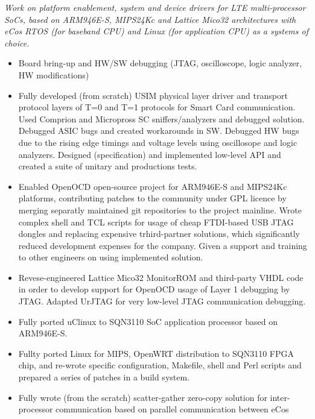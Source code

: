 \documentclass[a4paper, oneside, final]{scrartcl}
\begin{document}
   \textit{Work on platform enablement, system and device drivers for LTE
   multi-processor SoCs, based on ARM946E-S, MIPS24Kc and Lattice Mico32
   architectures with eCos RTOS (for baseband CPU) and Linux (for application CPU)
   as a systems of choice.}

\begin{itemize}
   \item Board bring-up and HW/SW debugging (JTAG, oscilloscope,
         logic analyzer, HW modifications)
   \item Fully developed (from scratch) USIM physical layer driver and
            transport protocol layers of T=0 and T=1 protocols for Smart Card
            communication. Used Comprion and Micropross SC sniffers/analyzers
            and debugged solution. Debugged ASIC bugs and created workarounds
            in SW. Debugged HW bugs due to the rising edge timings and voltage
            levels using oscillosope and logic analyzers. 
            Designed (specification) and implemented low-level API and 
            created a suite of unitary and productions tests.
   \item Enabled OpenOCD open-source project for ARM946E-S and MIPS24Kc
            platforms, contributing patches to the community under GPL
            licence by merging separatly maintained git repositories to the
            project mainline. Wrote complex shell and TCL scripts for usage of cheap
            FTDI-based USB JTAG dongles and replacing expensive trhird-partner solutions,
            which significantly reduced development expenses for the company.
            Given a support and training to other engineers on using
            implemented solution. 
   \item Revese-engineered Lattice Mico32 MonitorROM and third-party VHDL code
            in order to develop support for OpenOCD usage of Layer 1 debugging by
            JTAG. Adapted UrJTAG for very low-level JTAG communication debugging.
   \item Fully ported uClinux to SQN3110 SoC application processor based on
            ARM946E-S.
   \item Fullty ported Linux for MIPS, OpenWRT distribution to SQN3110 FPGA
            chip, and re-wrote specific configuration, Makefile, shell and Perl scripts
            and prepared a series of patches in a build system.
   \item Fully wrote (from the scratch) scatter-gather zero-copy solution for
            inter-processor communication based on parallel communication between eCos

\end{itemize}
\end{document}
